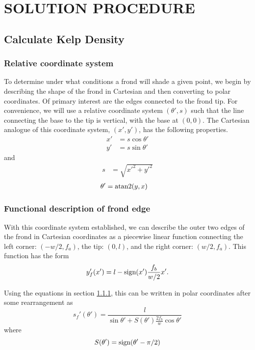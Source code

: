 \chapter{SOLUTION PROCEDURE}
\section{Calculate Kelp Density}
\subsection{Relative coordinate system}
\label{sec:rel_coords}
To determine under what conditions a frond will shade a given point, we begin by
describing the shape of the frond in Cartesian and then converting to polar coordinates.
Of primary interest are the edges connected to the frond tip.
For convenience, we will use a relative coordinate system $(\theta',s)$ such that the line connecting the base to the tip is vertical, with the base at $(0,0)$.
The Cartesian analogue of this coordinate system, $(x',y')$, has the following properties.
\begin{align}
	x' &= s\cos\theta' \\ 
	y' &= s\sin\theta'
\end{align}
and
\begin{align}
	s &= \sqrt{x'^2+y'^2}
\end{align}
\vspace{-1em}
\begin{align}
	\theta' &= \operatorname{atan2}(y, x)
\end{align}

\subsection{Functional description of frond edge}
With this coordinate system established, we can describe the outer two edges of the frond in Cartesian coordinates as a piecewise linear function connecting the left corner: $(-w/2,f_a)$, the tip: $(0,l)$, and the right corner: $(w/2,f_a)$.
This function has the form
\begin{equation}
	y'_f(x') = l-\mbox{sign}(x')\frac{f_b}{w/2}x'.
\end{equation}

Using the equations in section \ref{sec:rel_coords}, this can be written in polar coordinates after some rearrangement as
\begin{equation}
	s_f'(\theta') = \frac{l}{\sin\theta' + S(\theta')\frac{2f_b}{w}\cos\theta'}
\end{equation}
where
\begin{equation}
	S(\theta') = \mbox{sign}(\theta'-\pi/2)
\end{equation}

